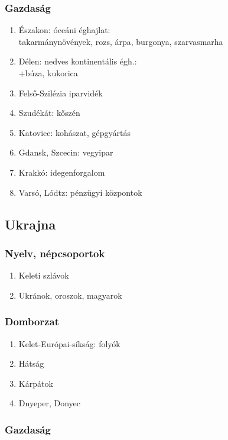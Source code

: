 \documentclass{article}
\begin{document}
\subsubsection{Gazdaság}

\begin{enumerate}
    \item Északon: óceáni éghajlat: \\
    takarmánynövények, rozs, árpa, burgonya, szarvasmarha
    \item Délen: nedves kontinentális égh.: \\
    +búza, kukorica
    \item Felső-Szilézia iparvidék
    \item Szudékát: kőszén
    \item Katovice: kohászat, gépgyártás
    \item Gdansk, Szcecin: vegyipar
    \item Krakkó: idegenforgalom
    \item Varsó, Lódtz: pénzügyi központok
\end{enumerate}

\subsection{Ukrajna}
\subsubsection{Nyelv, népcsoportok}

\begin{enumerate}
    \item Keleti szlávok
    \item Ukránok, oroszok, magyarok
\end{enumerate}

\subsubsection{Domborzat}

\begin{enumerate}
    \item Kelet-Európai-síkság: folyók
    \item Hátság
    \item Kárpátok
    \item Dnyeper, Donyec
\end{enumerate}

\subsubsection{Gazdaság}
\end{document}
